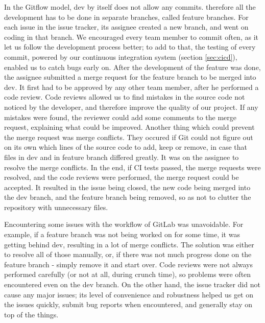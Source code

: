 \documentclass{l3proj}
\begin{document}


In the Gitflow model, dev by itself does not allow any commits. therefore
 all the development has to be done in separate branches, called feature
 branches. For each issue in the issue tracker, its assignee created a
 new branch, and went on coding in that branch. We encouraged every team
 member to commit often, as it let us follow the development process better;
 to add to that, the testing of every commit, powered by our continuous
 integration system (section \ref{sec:cicd}), enabled us to catch bugs
 early on. After the development of the feature was done, the assignee
 submitted a merge request for the feature branch to be merged into dev.
 It first had to be approved by any other team member, after he performed a
 code review. Code reviews allowed us to find mistakes in the source code not
 noticed by the developer, and therefore improve the quality of our project.
 If any mistakes were found, the reviewer could add some comments to the merge
 request, explaining what could be improved. Another thing which could
 prevent the merge request was merge conflicts. They occured if Git could not
 figure out on its own which lines of the source code to add, keep or
 remove, in case that files in dev and in feature branch differed
 greatly. It was on the assignee to resolve the merge conflicts. In
 the end, if CI tests passed, the merge requests were resolved, and
 the code reviews were performed, the merge request could be accepted.
 It resulted in the issue being closed, the new code being merged into
 the dev branch, and the feature branch being removed, so as not to
 clutter the repository with unnecessary files.

Encountering some issues with the workflow of GitLab was unavoidable.
 For example, if a feature branch was not being worked on for some time,
 it was getting behind dev, resulting in a lot of merge conflicts.
 The solution was either to resolve all of those manually, or, if
 there was not much progress done on the feature branch - simply remove
 it and start over. Code reviews were not always performed carefully
 (or not at all, during crunch time), so problems were often encountered
 even on the dev branch. On the other hand, the issue tracker did not
 cause any major issues; its level of convenience and robustness helped
 us get on the issues quickly, submit bug reports when encountered,
 and generally stay on top of the things.


\end{document}
